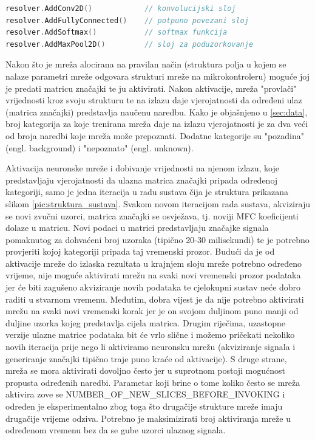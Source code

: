 \begin{lstlisting}[language=C++, caption=Gradnja arhitekture mreže, label=code:resolver]
resolver.AddConv2D()            // konvolucijski sloj
resolver.AddFullyConnected()    // potpuno povezani sloj
resolver.AddSoftmax()           // softmax funkcija
resolver.AddMaxPool2D()         // sloj za poduzorkovanje
\end{lstlisting}

Nakon što je mreža alocirana na pravilan način (struktura polja u kojem se nalaze parametri
mreže odgovara strukturi mreže na mikrokontroleru) moguće joj je predati matricu značajki
te ju aktivirati. Nakon aktivacije, mreža "provlači" vrijednosti kroz svoju strukturu te na
izlazu daje vjerojatnosti da određeni ulaz (matrica značajki) predstavlja naučenu naredbu. 
Kako je objašnjeno u \ref{sec:data}, broj kategorija za koje trenirana mreža daje na izlazu
vjerojatnosti je za dva veći od broja naredbi koje mreža može prepoznati. Dodatne kategorije
su "pozadina" (engl. background) i "nepoznato" (engl. unknown). 

Aktivacija neuronske mreže i dobivanje vrijednosti na njenom izlazu, koje predstavljaju
vjerojatnosti da ulazna matrica značajki pripada određenoj kategoriji, samo je jedna iteracija 
u radu sustava čija je struktura prikazana slikom \ref{pic:struktura_sustava}. Svakom novom 
iteracijom rada sustava, akviziraju se novi zvučni uzorci, matrica značajki se osvježava, 
tj. noviji MFC koeficijenti dolaze u matricu. Novi podaci u matrici predstavljaju značajke 
signala pomaknutog za dohvaćeni broj uzoraka (tipično 20-30 milisekundi) te je potrebno provjeriti
kojoj kategoriji pripada taj vremenski prozor. Budući da je od aktivacije mreže do izlaska 
rezultata u krajnjem sloju mreže potrebno određeno vrijeme, nije moguće aktivirati mrežu 
na svaki novi vremenski prozor podataka jer će biti zagušeno akviziranje novih podataka
te cjelokupni sustav neće dobro raditi u stvarnom vremenu. Međutim, dobra vijest je da
nije potrebno aktivirati mrežu na svaki novi vremenski korak jer je on svojom duljinom
puno manji od duljine uzorka kojeg predstavlja cijela matrica. Drugim riječima, uzastopne
verzije ulazne matrice podataka bit će vrlo slične i možemo pričekati nekoliko novih
iteracija prije nego li aktiviramo neuronsku mrežu (akviziranje signala i generiranje značajki
tipično traje puno kraće od aktivacije). S druge strane, mreža se mora aktivirati dovoljno
često jer u suprotnom postoji mogućnost propusta određenih naredbi. Parametar koji brine o tome 
koliko često se mreža aktivira zove se NUMBER\_OF\_NEW\_SLICES\_BEFORE\_INVOKING i određen
je eksperimentalno zbog toga što drugačije strukture mreže imaju drugačije vrijeme odziva.
Potrebno je maksimizirati broj aktiviranja mreže u određenom vremenu bez da se gube
uzorci ulaznog signala.

